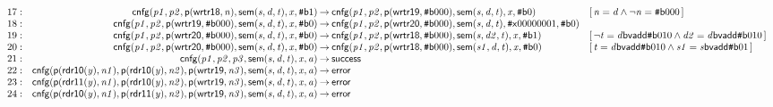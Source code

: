 \documentclass[a4paper]{article}
\newcommand{\ttsym}[1]{\mbox{\tt #1}}
\def\ttsharp{\ttsym{\symbol{35}}}
\newcommand{\symb}[1]{\mathsf{#1}}
\newcommand{\var}[1]{\mathit{#1}}
\newcommand{\Constraint}[1]{[\, #1 \,]}
\newcommand{\bv}[2][b]{{\ttsharp\symb{#1}{#2}}}
\begin{document}
\begin{landscape}
\[\begin{array}{rr@{\>}c@{\>}ll}
\mathrm{17} : 
 & \symb{cnfg}(\var{p1},\var{p2},\symb{p}(\symb{wrtr18},\var{n}),\symb{sem}(\var{s},\var{d},\var{t}),\var{x},\bv{1})
 & \to 
 & \symb{cnfg}(\var{p1},\var{p2},\symb{p}(\symb{wrtr19},\bv{000}),\symb{sem}(\var{s},\var{d},\var{t}),\var{x},\bv{0})
 & \Constraint{\var{n} = \var{d} \land \neg \var{n} = \bv{000}}\\

\mathrm{18} : 
 & \symb{cnfg}(\var{p1},\var{p2},\symb{p}(\symb{wrtr19},\bv{000}),\symb{sem}(\var{s},\var{d},\var{t}),\var{x},\bv{0})
 & \to 
 & \symb{cnfg}(\var{p1},\var{p2},\symb{p}(\symb{wrtr20},\bv{000}),\symb{sem}(\var{s},\var{d},\var{t}),\bv[x]{00000001},\bv{0})\\

\mathrm{19} : 
 & \symb{cnfg}(\var{p1},\var{p2},\symb{p}(\symb{wrtr20},\bv{000}),\symb{sem}(\var{s},\var{d},\var{t}),\var{x},\bv{0})
 & \to 
 & \symb{cnfg}(\var{p1},\var{p2},\symb{p}(\symb{wrtr18},\bv{000}),\symb{sem}(\var{s},\var{d2},\var{t}),\var{x},\bv{1})
 & \Constraint{\neg \var{t} = \var{d} \symb{bvadd} \bv{010} \land \var{d2} = \var{d} \symb{bvadd} \bv{010}}\\

\mathrm{20} : 
 & \symb{cnfg}(\var{p1},\var{p2},\symb{p}(\symb{wrtr20},\bv{000}),\symb{sem}(\var{s},\var{d},\var{t}),\var{x},\bv{0})
 & \to 
 & \symb{cnfg}(\var{p1},\var{p2},\symb{p}(\symb{wrtr18},\bv{000}),\symb{sem}(\var{s1},\var{d},\var{t}),\var{x},\bv{0})
 & \Constraint{\var{t} = \var{d} \symb{bvadd} \bv{010} \land \var{s1} = \var{s} \symb{bvadd} \bv{01}}\\

\mathrm{21} : 
 & \symb{cnfg}(\var{p1},\var{p2},\var{p3},\symb{sem}(\var{s},\var{d},\var{t}),\var{x},\var{a})
 & \to 
 & \symb{success}\\

\mathrm{22} : 
 & \symb{cnfg}(\symb{p}(\symb{rdr10}(\var{y}),\var{n1}),\symb{p}(\symb{rdr10}(\var{y}),\var{n2}),\symb{p}(\symb{wrtr19},\var{n3}),\symb{sem}(\var{s},\var{d},\var{t}),\var{x},\var{a})
 & \to 
 & \symb{error}\\

\mathrm{23} : 
 & \symb{cnfg}(\symb{p}(\symb{rdr11}(\var{y}),\var{n1}),\symb{p}(\symb{rdr10}(\var{y}),\var{n2}),\symb{p}(\symb{wrtr19},\var{n3}),\symb{sem}(\var{s},\var{d},\var{t}),\var{x},\var{a})
 & \to 
 & \symb{error}\\

\mathrm{24} : 
 & \symb{cnfg}(\symb{p}(\symb{rdr10}(\var{y}),\var{n1}),\symb{p}(\symb{rdr11}(\var{y}),\var{n2}),\symb{p}(\symb{wrtr19},\var{n3}),\symb{sem}(\var{s},\var{d},\var{t}),\var{x},\var{a})
 & \to 
 & \symb{error}\\


\end{array}\]
\end{landscape}
\end{document}
